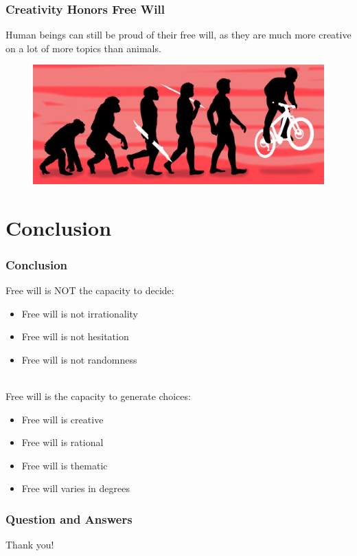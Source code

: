 \documentclass[xcolor=dvipsnames]{beamer}
\theoremstyle{definition}
\begin{document}
\begin{frame}[fragile]
  \frametitle{Creativity Honors Free Will}

  Human beings can still be proud of their free will, as they are much more creative on a lot of more topics than animals.

  \begin{figure}
    \centering
    \includegraphics[width=1\textwidth]{images/degrees.jpg}
  \end{figure}
\end{frame}



\section{Conclusion} %
\label{sec:conclusion}

\begin{frame}[fragile]
  \frametitle{Conclusion}

  Free will is NOT the \alert{capacity to decide}:
  \begin{itemize}
  \item Free will is not irrationality
  \item Free will is not hesitation
  \item Free will is not randomness
  \end{itemize}\\[0.6cm]

  Free will is the \alert{capacity to generate choices}:
  \begin{itemize}
  \item Free will is creative
  \item Free will is rational
  \item Free will is thematic
  \item Free will varies in degrees
  \end{itemize}
\end{frame}

\begin{frame}[fragile]
  \frametitle{Question and Answers}

  \begin{center}
    \Huge{Thank you!}
  \end{center}

\end{frame}
\end{document}
